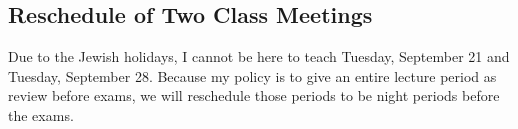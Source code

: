 \subsection*{Reschedule of Two Class Meetings}

Due to the Jewish holidays, I cannot be here to teach Tuesday, September 21 and Tuesday, September 28. Because my policy is to give an entire lecture period as review before exams, we will reschedule those periods to be night periods before the exams.